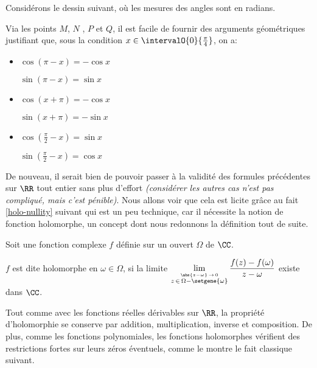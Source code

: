 Considérons le dessin suivant, où les mesures des angles sont en radians.

\begin{center}
\end{center}

Via les points $M$, $N$ , $P$ et $Q$, il est facile de fournir des arguments géométriques justifiant que, sous la condition $x \in \intervalO{0}{\frac{\pi}{4}}$, on a:
%
\begin{multicols}{3}
\begin{itemize}[label=\small\textbullet]
	\item $\cos (\pi - x) = - \cos x$

	      \noindent
	      $\sin (\pi - x) = \sin x$ 

	\item $\cos (x + \pi) = - \cos x$

	      \noindent
	      $\sin (x + \pi) = - \sin x$

	\item $\cos \left( \frac{\pi}{2} - x \right) = \sin x$

	      \noindent
	      $\sin \left( \frac{\pi}{2} - x \right) = \cos x$ 
\end{itemize}
\end{multicols}


De nouveau, il serait bien de pouvoir passer à la validité des formules précédentes sur $\RR$ tout entier sans plus d'effort \emph{(considérer les autres cas n'est pas compliqué, mais c'est pénible)}.
%
Nous allons voir que cela est licite grâce au fait \ref{holo-nullity} suivant qui est un peu technique, car il nécessite la notion de fonction holomorphe, un concept dont nous redonnons la définition tout de suite.


\begin{definition*}
	Soit une fonction complexe $f$ définie sur un ouvert $\Omega$ de $\CC$.
	
	\smallskip
	
	$f$ est dite holomorphe en $\omega \in \Omega$, si la limite $\displaystyle \lim_{\stackrel{\abs{z - \omega} \, \rightarrow \, 0}{z \, \in \, \Omega - \setgene{\omega}}} \frac{f(z) - f(\omega)}{z - \omega}$ existe dans $\CC$.
\end{definition*}


\medskip

Tout comme avec les fonctions réelles dérivables sur $\RR$, la propriété d'holomorphie se conserve par addition, multiplication, inverse et composition.
De plus, comme les fonctions polynomiales, les fonctions holomorphes vérifient des restrictions fortes sur leurs zéros éventuels, comme le montre le fait classique suivant.


